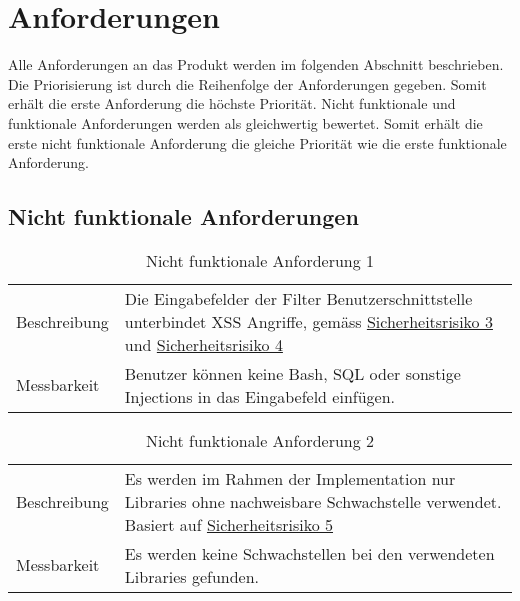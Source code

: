 \section{Anforderungen}
Alle Anforderungen an das Produkt werden im folgenden Abschnitt beschrieben. Die Priorisierung ist durch die Reihenfolge der 
Anforderungen gegeben. Somit erhält die erste Anforderung die höchste Priorität. Nicht funktionale und funktionale Anforderungen
werden als gleichwertig bewertet. Somit erhält die erste nicht funktionale Anforderung die gleiche Priorität wie die erste funktionale Anforderung.

\subsection{Nicht funktionale Anforderungen}

\begin{table}[h!]
   \begin{tabular}{|L{0.3\textwidth}|L{0.6\textwidth}|}
       \hline
         \\[4pt]
       \hline
       Beschreibung & Die Eingabefelder der Filter Benutzerschnittstelle unterbindet XSS Angriffe, gemäss \hyperref[sec3]{\color{blue}Sicherheitsrisiko 3} und \hyperref[sec4]{\color{blue}Sicherheitsrisiko 4}  \\
       \hline
       Messbarkeit & Benutzer können keine Bash, SQL oder sonstige Injections in das Eingabefeld einfügen.  \\
       \hline
     \end{tabular}
     \caption{Nicht funktionale Anforderung 1}
\end{table}

\begin{table}[h!]
   \begin{tabular}{|L{0.3\textwidth}|L{0.6\textwidth}|}
       \hline
         \\[4pt]
       \hline
       Beschreibung & Es werden im Rahmen der Implementation nur Libraries ohne nachweisbare Schwachstelle verwendet. Basiert auf \hyperref[sec5]{\color{blue}Sicherheitsrisiko 5}  \\
       \hline
       Messbarkeit & Es werden keine Schwachstellen bei den verwendeten Libraries gefunden.    \\
       \hline
     \end{tabular}
     \caption{Nicht funktionale Anforderung 2}
\end{table}

